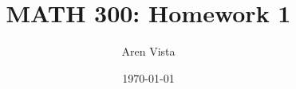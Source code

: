 \documentclass[11pt]{article}
\title{ MATH 300: Homework 1}
\author{ Aren Vista }
\date{\today}
\theoremstyle{plain}
\begin{document}
\maketitle	
\pagebreak

\section{}
\end{document}
